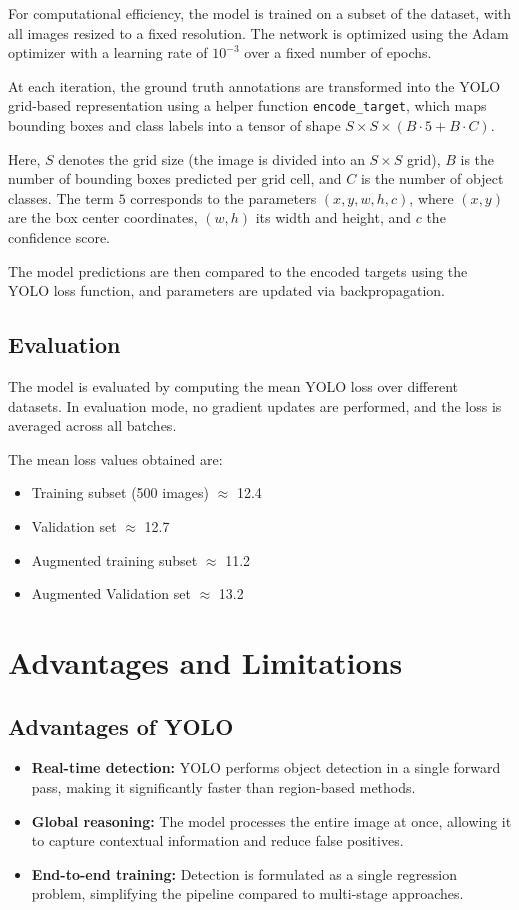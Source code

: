 \documentclass[10pt, a4paper]{article}
\begin{document}
For computational efficiency, the model is trained on a subset of the dataset, with all images resized to a fixed resolution. The network is optimized using the Adam optimizer with a learning rate of $10^{-3}$ over a fixed number of epochs.

At each iteration, the ground truth annotations are transformed into the YOLO grid-based representation using a helper function \texttt{encode\_target}, which maps bounding boxes and class labels into a tensor of shape $S \times S \times (B \cdot 5 + B \cdot C)$.

Here, $S$ denotes the grid size (the image is divided into an $S \times S$ grid), $B$ is the number of bounding boxes predicted per grid cell, and $C$ is the number of object classes. The term $5$ corresponds to the parameters $(x, y, w, h, c)$, where $(x, y)$ are the box center coordinates, $(w, h)$ its width and height, and $c$ the confidence score.

The model predictions are then compared to the encoded targets using the YOLO loss function, and parameters are updated via backpropagation.


\subsection{Evaluation}

The model is evaluated by computing the mean YOLO loss over different datasets. In evaluation mode, no gradient updates are performed, and the loss is averaged across all batches.

The mean loss values obtained are:
\begin{itemize}
	\item Training subset (500 images) $\approx$  12.4
	\item Validation set $\approx$ 12.7
	\item Augmented training subset $\approx$ 11.2
	\item Augmented Validation set $\approx$ 13.2
\end{itemize}

\section{Advantages and Limitations}

\subsection{Advantages of YOLO}
\begin{itemize}
	\item \textbf{Real-time detection:} YOLO performs object detection in a single forward pass, making it significantly faster than region-based methods.
	
	\item \textbf{Global reasoning:} The model processes the entire image at once, allowing it to capture contextual information and reduce false positives.
	
	\item \textbf{End-to-end training:} Detection is formulated as a single regression problem, simplifying the pipeline compared to multi-stage approaches.
\end{itemize}
\end{document}
